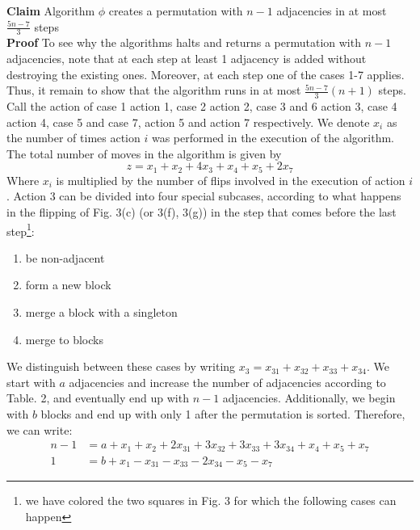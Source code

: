 \textbf{Claim} Algorithm $\phi$ creates a permutation with $n-1$ adjacencies in at most $\frac{5n - 7}{3}$ steps 
\\
\textbf{Proof}
To see why the algorithms halts and returns a permutation with $n-1$ adjacencies, note that at each step at least 1 adjacency is added without destroying the existing ones. Moreover, at each step one of the cases 1-7 applies. Thus, it remain to show that the algorithm runs in at most $\frac{5n-7}{3}(n+1)$ steps. \\ 
Call the action of case 1 action 1, case 2 action 2, case 3 and 6 action 3, case 4 action 4, case 5 and case 7, action 5 and action 7 respectively. We denote $x_{i}$ as the number of times action $i$ was performed in the execution of the algorithm. The total number of moves in the algorithm is given by 
\begin{equation}\label{eq:objective}
    z = x_1 + x_2 + 4x_3 + x_4 + x_5 + 2x_7  
\end{equation}
Where $x_i$ is multiplied by the number of flips involved in the execution of action $i$. Action 3 can be divided into four special subcases, according to what happens in the flipping of Fig. 3(c) (or 3(f), 3(g)) in the step that comes before the last step\footnote{we have colored the two squares in Fig. 3 for which the following cases can happen}: 
\begin{enumerate}
\item be non-adjacent 
\item form a new block 
\item merge a block with a singleton 
\item merge to blocks
\end{enumerate} 
We distinguish between these cases by writing $x_3 = x_{31} + x_{32} + x_{33} + x_{34}$. We start with $a$ adjacencies and increase the number of adjacencies according to Table. 2, and eventually end up with $n-1$ adjacencies. Additionally, we begin with $b$ blocks and end up with only 1 after the permutation is sorted. Therefore, we can write: 
\begin{align} 
n - 1 &= a + x_1 + x_2 + 2x_{31} + 3x_{32} + 3x_{33} + 3x_{34} + x_4 + x_5 + x_7 \\
1 &= b + x_1 - x_{31} - x_{33} - 2x_{34} - x_{5} - x_7 
\end{align} 

